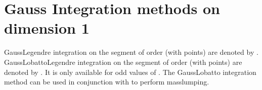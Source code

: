 \documentclass[a4paper,11pt,english]{sphinxmanual}
\begin{document}
\section{Gauss Integration methods on dimension 1}
\label{\detokenize{userdoc/appendixB:gauss-integration-methods-on-dimension-1}}
Gauss\sphinxhyphen{}Legendre integration on the segment of order
 (with  points)
are denoted by . Gauss\sphinxhyphen{}Lobatto\sphinxhyphen{}Legendre integration on the
segment of order  (with  points) are denoted by
. It is only available for odd values of . The
Gauss\sphinxhyphen{}Lobatto integration method can be used in conjunction with
 to perform mass\sphinxhyphen{}lumping.
\end{document}
